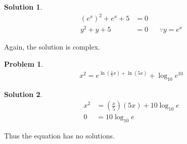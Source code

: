 \documentclass[a4paper]{article}
\theoremstyle{definition}
\newtheorem{problem}{Problem}[section]
\newtheorem*{solution}{Solution}
\begin{document}
\begin{solution}
\begin{align*}
(e^x)^2 + e^x + 5 &= 0 \\
y^2 + y + 5 &= 0 && \because y = e^x
\end{align*}

Again, the solution is complex.
\end{solution}

\begin{problem}
\begin{align*}
x^2 = e^{\ln\left(\frac{1}{5}x\right)+ \ln(5x)} + \log_{10}e^{10}
\end{align*}
\end{problem}

\begin{solution}
\begin{align*}
x^2 &= \left(\frac{x}{5}\right)(5x) + 10 \log_{10} e \\
0 &= 10\log_{10} {e}
\end{align*}

Thus the equation has no solutions.
\end{solution}
\end{document}
